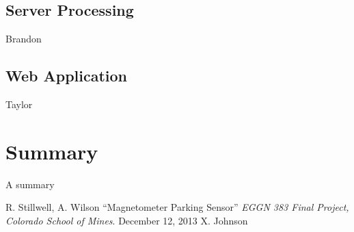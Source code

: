 \documentclass[11pt, oneside, fullpage, doublespace]{article}
\begin{document}
\subsection{Server Processing}
Brandon
\subsection{Web Application}
Taylor


\section{Summary}
A summary \cite{johnson2012}


\begin{thebibliography}{99}
 R. Stillwell, A. Wilson ``Magnetometer Parking Sensor'' \emph{EGGN 383 Final Project, Colorado School of Mines}. December 12, 2013
 X. Johnson
\end{thebibliography}
\end{document}
